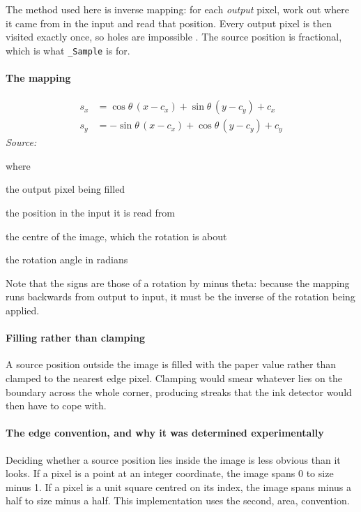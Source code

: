 The method used here is inverse mapping: for each \emph{output} pixel, work out where it came from in the input and read that position. Every output pixel is then visited exactly once, so holes are impossible \cite{wolberg1990}. The source position is fractional, which is what \texttt{\_Sample} is for.


\paragraph{The mapping}

\begin{equation}
\begin{aligned}s_x &= \cos\theta\,(x - c_x) + \sin\theta\,(y - c_y) + c_x \\s_y &= -\sin\theta\,(x - c_x) + \cos\theta\,(y - c_y) + c_y\end{aligned}
\end{equation}
\noindent\emph{Source: }\cite{wolberg1990}


\noindent where
\begin{description}[leftmargin=2.4em,style=nextline,font=\normalfont\ttfamily]\setlength\itemsep{1pt}
  \item[{$x,\, y$}] \normalfont the output pixel being filled
  \item[{$s_x,\, s_y$}] \normalfont the position in the input it is read from
  \item[{$c_x,\, c_y$}] \normalfont the centre of the image, which the rotation is about
  \item[{$\theta$}] \normalfont the rotation angle in radians
\end{description}
Note that the signs are those of a rotation by minus theta: because the mapping runs backwards from output to input, it must be the inverse of the rotation being applied.


\paragraph{Filling rather than clamping}
A source position outside the image is filled with the paper value rather than clamped to the nearest edge pixel. Clamping would smear whatever lies on the boundary across the whole corner, producing streaks that the ink detector would then have to cope with.


\paragraph{The edge convention, and why it was determined experimentally}
Deciding whether a source position lies inside the image is less obvious than it looks. If a pixel is a point at an integer coordinate, the image spans 0 to size minus 1. If a pixel is a unit square centred on its index, the image spans minus a half to size minus a half. This implementation uses the second, area, convention.


